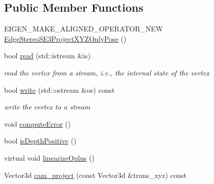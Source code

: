 \subsection*{Public Member Functions}
\begin{DoxyCompactItemize}
\item 
E\+I\+G\+E\+N\+\_\+\+M\+A\+K\+E\+\_\+\+A\+L\+I\+G\+N\+E\+D\+\_\+\+O\+P\+E\+R\+A\+T\+O\+R\+\_\+\+N\+EW \mbox{\hyperlink{classg2o_1_1_edge_stereo_s_e3_project_x_y_z_only_pose_a083a4f79a0ac5ff0deab0c9e8e9c9907}{Edge\+Stereo\+S\+E3\+Project\+X\+Y\+Z\+Only\+Pose}} ()
\item 
bool \mbox{\hyperlink{classg2o_1_1_edge_stereo_s_e3_project_x_y_z_only_pose_ae199c5428259a7d50e9897029ae9fd70}{read}} (std\+::istream \&is)
\begin{DoxyCompactList}\small\item\em read the vertex from a stream, i.\+e., the internal state of the vertex \end{DoxyCompactList}\item 
bool \mbox{\hyperlink{classg2o_1_1_edge_stereo_s_e3_project_x_y_z_only_pose_a8e7cb830d9d0d9675733294b692bd3d8}{write}} (std\+::ostream \&os) const
\begin{DoxyCompactList}\small\item\em write the vertex to a stream \end{DoxyCompactList}\item 
void \mbox{\hyperlink{classg2o_1_1_edge_stereo_s_e3_project_x_y_z_only_pose_af6fd2fdbdc9b4a6bcf21303ff3b8ea83}{compute\+Error}} ()
\item 
bool \mbox{\hyperlink{classg2o_1_1_edge_stereo_s_e3_project_x_y_z_only_pose_a5155075418c27ce8a1387d739ccbdf26}{is\+Depth\+Positive}} ()
\item 
virtual void \mbox{\hyperlink{classg2o_1_1_edge_stereo_s_e3_project_x_y_z_only_pose_a0b2b815e8ae331276f33be374dcc1897}{linearize\+Oplus}} ()
\item 
Vector3d \mbox{\hyperlink{classg2o_1_1_edge_stereo_s_e3_project_x_y_z_only_pose_a6545d86fffb69bb1aa71350fe6d70846}{cam\+\_\+project}} (const Vector3d \&trans\+\_\+xyz) const
\end{DoxyCompactItemize}
